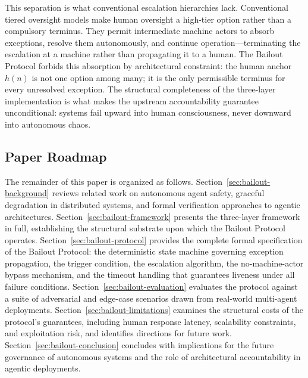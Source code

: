 This separation is what conventional escalation hierarchies lack. Conventional tiered oversight models make human oversight a high-tier option rather than a compulsory terminus. They permit intermediate machine actors to absorb exceptions, resolve them autonomously, and continue operation—terminating the escalation at a machine rather than propagating it to a human. The \bxthree Bailout Protocol forbids this absorption by architectural constraint: the human anchor $h(n)$ is not one option among many; it is the only permissible terminus for every unresolved exception. The structural completeness of the three-layer implementation is what makes the upstream accountability guarantee unconditional: \bxthree systems fail upward into human consciousness, never downward into autonomous chaos.

\subsection{Paper Roadmap}

The remainder of this paper is organized as follows. Section~\ref{sec:bailout-background} reviews related work on autonomous agent safety, graceful degradation in distributed systems, and formal verification approaches to agentic architectures. Section~\ref{sec:bailout-framework} presents the \bxthree three-layer framework in full, establishing the structural substrate upon which the Bailout Protocol operates. Section~\ref{sec:bailout-protocol} provides the complete formal specification of the Bailout Protocol: the deterministic state machine governing exception propagation, the trigger condition, the escalation algorithm, the no-machine-actor bypass mechanism, and the timeout handling that guarantees liveness under all failure conditions. Section~\ref{sec:bailout-evaluation} evaluates the protocol against a suite of adversarial and edge-case scenarios drawn from real-world multi-agent deployments. Section~\ref{sec:bailout-limitations} examines the structural costs of the protocol's guarantees, including human response latency, scalability constraints, and exploitation risk, and identifies directions for future work. Section~\ref{sec:bailout-conclusion} concludes with implications for the future governance of autonomous systems and the role of architectural accountability in agentic deployments.
